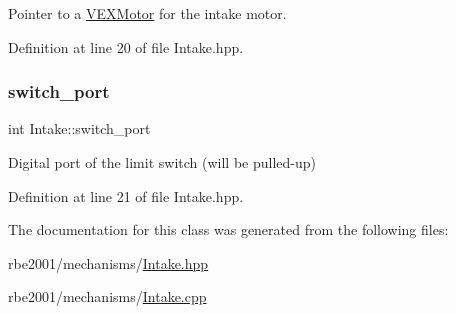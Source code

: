 Pointer to a \hyperlink{class_v_e_x_motor}{V\+E\+X\+Motor} for the intake motor. 



Definition at line 20 of file Intake.\+hpp.

\mbox{\label{class_intake_aa42c4826bb88549c29ff88a355765787}} 
\subsubsection{\texorpdfstring{switch\+\_\+port}{switch\_port}}
{\footnotesize\ttfamily int Intake\+::switch\+\_\+port\hspace{0.3cm}{\ttfamily [private]}}



Digital port of the limit switch (will be pulled-\/up) 



Definition at line 21 of file Intake.\+hpp.



The documentation for this class was generated from the following files\+:\begin{DoxyCompactItemize}
\item 
rbe2001/mechanisms/\hyperlink{_intake_8hpp}{Intake.\+hpp}\item 
rbe2001/mechanisms/\hyperlink{_intake_8cpp}{Intake.\+cpp}\end{DoxyCompactItemize}
